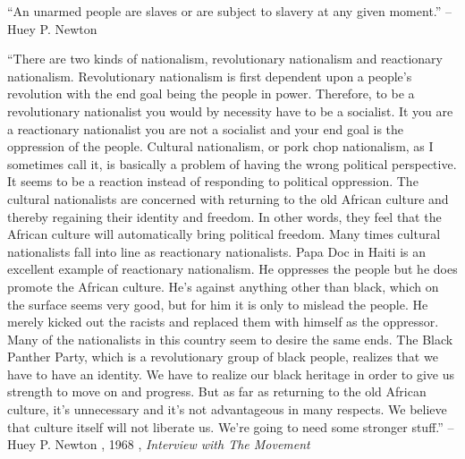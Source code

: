 \documentclass{article}%
\begin{document}
\linebreak%
\vspace{1mm}%
\begin{minipage}{\textwidth}%
\flushleft%
“An unarmed people are slaves or are subject to slavery at any given moment.”%
\linebreak%
\vspace{1mm}%
–Huey P. Newton%
\linebreak%
\vspace{1mm}%
\end{minipage}%
\linebreak%
\vspace{1mm}%
\begin{minipage}{\textwidth}%
\flushleft%
“There are two kinds of nationalism, revolutionary nationalism and reactionary  nationalism. Revolutionary nationalism is first dependent upon a people’s revolution with the end goal being the people in power. Therefore, to be a revolutionary nationalist you would by necessity have to be a socialist. It you are a reactionary nationalist you are not a socialist and your end goal is the oppression of the people. Cultural nationalism, or pork chop nationalism, as I sometimes call it, is basically a problem of having the wrong political perspective. It seems to be a reaction instead of responding to political oppression. The cultural nationalists are concerned with returning to the old African culture and thereby regaining their identity and freedom. In other words, they feel that the African culture will automatically bring political freedom. Many times cultural nationalists fall into line as reactionary nationalists. Papa Doc in Haiti is an excellent example of reactionary nationalism. He oppresses the people but he does promote the African culture. He’s against anything other than black, which on the surface seems very good, but for him it is only to mislead the people. He merely kicked out the racists and replaced them with himself as the oppressor. Many of the nationalists in this country seem to desire the same ends. The Black Panther Party, which is a revolutionary group of black people, realizes that we have to have an identity. We have to realize our black heritage in order to give us strength to move on and progress. But as far as returning to the old African culture, it’s unnecessary and it’s not advantageous in many respects. We believe that culture itself will not liberate us. We’re going to need some stronger stuff.”%
\linebreak%
\vspace{1mm}%
–Huey P. Newton%
, 1968%
, \textit{Interview with The Movement}%
\linebreak%
\vspace{1mm}%
\end{minipage}%
\end{document}

